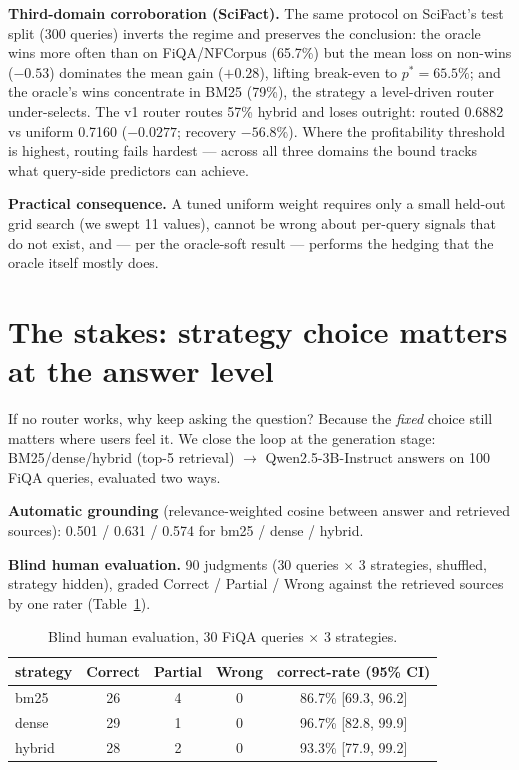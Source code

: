 \documentclass[11pt]{article}
\begin{document}
\textbf{Third-domain corroboration (SciFact).} The same protocol on SciFact's test split (300 queries) inverts the regime and preserves the conclusion: the oracle wins more often than on FiQA/NFCorpus (65.7\%) but the mean loss on non-wins ($-0.53$) dominates the mean gain ($+0.28$), lifting break-even to $p^*{=}65.5\%$; and the oracle's wins concentrate in BM25 (79\%), the strategy a level-driven router under-selects. The v1 router routes 57\% hybrid and loses outright: routed 0.6882 vs uniform 0.7160 ($-0.0277$; recovery $-56.8\%$). Where the profitability threshold is highest, routing fails hardest --- across all three domains the bound tracks what query-side predictors can achieve.

\textbf{Practical consequence.} A tuned uniform weight requires only a small held-out grid search (we swept 11 values), cannot be wrong about per-query signals that do not exist, and --- per the oracle-soft result --- performs the hedging that the oracle itself mostly does.

\section{The stakes: strategy choice matters at the answer level}
If no router works, why keep asking the question? Because the \emph{fixed} choice still matters where users feel it. We close the loop at the generation stage: BM25/dense/hybrid (top-5 retrieval) $\to$ Qwen2.5-3B-Instruct answers on 100 FiQA queries, evaluated two ways.

\textbf{Automatic grounding} (relevance-weighted cosine between answer and retrieved sources): 0.501 / 0.631 / 0.574 for bm25 / dense / hybrid.

\textbf{Blind human evaluation.} 90 judgments (30 queries $\times$ 3 strategies, shuffled, strategy hidden), graded Correct / Partial / Wrong against the retrieved sources by one rater (Table~\ref{tab:human}).

\begin{table}[H]
\centering\small
\begin{tabular}{lcccc}
\toprule
strategy & Correct & Partial & Wrong & correct-rate (95\% CI) \\
\midrule
bm25   & 26 & 4 & 0 & 86.7\% [69.3, 96.2] \\
dense  & 29 & 1 & 0 & 96.7\% [82.8, 99.9] \\
hybrid & 28 & 2 & 0 & 93.3\% [77.9, 99.2] \\
\bottomrule
\end{tabular}
\caption{Blind human evaluation, 30 FiQA queries $\times$ 3 strategies.}
\label{tab:human}
\end{table}
\end{document}
